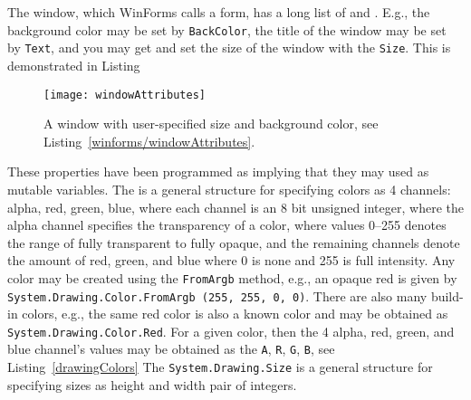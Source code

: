 The window, which WinForms calls a form, has a long list of  and . E.g., the background color may be set by \lstinline!BackColor!, the title of the window may be set by \lstinline!Text!, and you may get and set the size of the window with the \lstinline!Size!. This is demonstrated in Listing
%
%
\begin{figure}
  \centering
  \texttt{[image: windowAttributes]}
  \caption{A window with user-specified size and background color, see Listing~\ref{winforms/windowAttributes}.}
  \label{fig:openWindow}
\end{figure}
These properties have been programmed as  implying that they may used as mutable variables. The  is a general structure for specifying colors as 4 channels: alpha, red, green, blue, where each channel is an 8 bit unsigned integer, where the alpha channel specifies the transparency of a color, where values 0--255 denotes the range of fully transparent to fully opaque, and the remaining channels denote the amount of red, green, and blue where 0 is none and 255 is full intensity. Any color may be created using the \lstinline!FromArgb! method, e.g., an opaque red is given by \lstinline!System.Drawing.Color.FromArgb (255, 255, 0, 0)!. There are also many build-in colors, e.g., the same red color is also a known color and may be obtained as \lstinline!System.Drawing.Color.Red!. For a given color, then the 4 alpha, red, green, and blue channel's values may be obtained as the \lstinline!A!, \lstinline!R!, \lstinline!G!, \lstinline!B!, see Listing~\ref{drawingColors}
%
%
The \lstinline!System.Drawing.Size! is a general structure for specifying sizes as height and width pair of integers.

